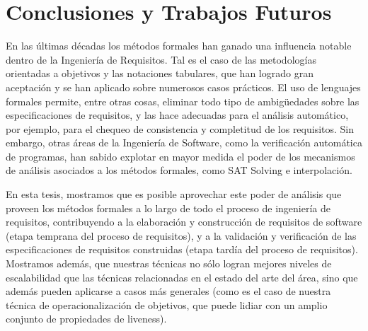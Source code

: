 \chapter{Conclusiones y Trabajos Futuros}
\label{cap:conclusion}
En las \'ultimas d\'ecadas los m\'etodos formales han ganado una influencia notable dentro de la Ingenier\'ia de Requisitos. Tal es el caso de las metodolog\'ias orientadas a objetivos y las notaciones tabulares, que han logrado gran aceptaci\'on y se han aplicado sobre numerosos casos pr\'acticos.
El uso de lenguajes formales permite, entre otras cosas, eliminar todo tipo de ambig\"uedades sobre las especificaciones de requisitos, y las hace adecuadas para el an\'alisis autom\'atico, por ejemplo, para el chequeo de consistencia y completitud de los requisitos. Sin embargo, otras \'areas de la Ingenier\'ia de Software, como la verificaci\'on autom\'atica de programas, han sabido explotar en mayor medida el poder de los mecanismos de an\'alisis asociados a los m\'etodos formales, como SAT Solving e interpolaci\'on. 

En esta tesis, mostramos que es posible aprovechar este poder de an\'alisis que proveen los m\'etodos formales a lo largo de todo el proceso de ingenier\'ia de requisitos, contribuyendo a la elaboraci\'on y construcci\'on de requisitos de software (etapa temprana del proceso de requisitos), y a la validaci\'on y verificaci\'on de las especificaciones de requisitos construidas (etapa tard\'ia del proceso de requisitos). 
Mostramos adem\'as, que nuestras t\'ecnicas no s\'olo logran mejores niveles de escalabilidad que las t\'ecnicas relacionadas en el estado del arte del \'area, sino que adem\'as pueden aplicarse a casos m\'as generales (como es el caso de nuestra t\'ecnica de operacionalizaci\'on de objetivos, que puede lidiar con un amplio conjunto de propiedades de liveness).


